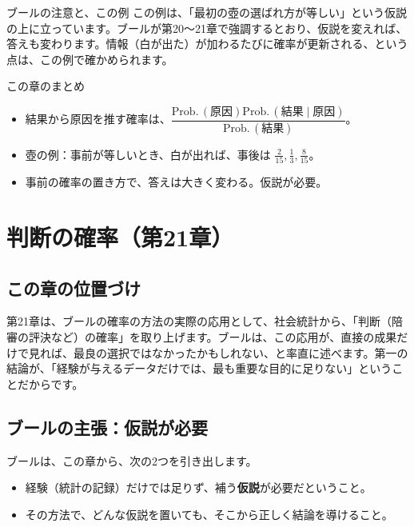 \documentclass[a4paper,11pt,openany]{ltjsbook}
\newcommand{\Prob}{\mathrm{Prob.}\,}
\begin{document}
\begin{notebox}{ブールの注意と、この例}
この例は、「最初の壺の選ばれ方が等しい」という仮説の上に立っています。ブールが第20〜21章で強調するとおり、仮説を変えれば、答えも変わります。情報（白が出た）が加わるたびに確率が更新される、という点は、この例で確かめられます。
\end{notebox}

\begin{pointbox}{この章のまとめ}
\begin{itemize}[leftmargin=*]
\item 結果から原因を推す確率は、$\dfrac{\Prob(\text{原因})\Prob(\text{結果}\mid\text{原因})}{\Prob(\text{結果})}$。
\item 壺の例：事前が等しいとき、白が出れば、事後は $\tfrac2{15},\tfrac13,\tfrac8{15}$。
\item 事前の確率の置き方で、答えは大きく変わる。仮説が必要。
\end{itemize}
\end{pointbox}

\chapter{判断の確率（第21章）}

\section{この章の位置づけ}

第21章は、ブールの確率の方法の実際の応用として、社会統計から、「判断（陪審の評決など）の確率」を取り上げます。ブールは、この応用が、直接の成果だけで見れば、最良の選択ではなかったかもしれない、と率直に述べます。第一の結論が、「経験が与えるデータだけでは、最も重要な目的に足りない」ということだからです。

\section{ブールの主張：仮説が必要}

ブールは、この章から、次の2つを引き出します。

\begin{itemize}[leftmargin=*]
\item 経験（統計の記録）だけでは足りず、補う\textbf{仮説}が必要だということ。
\item その方法で、どんな仮説を置いても、そこから正しく結論を導けること。
\end{itemize}
\end{document}
